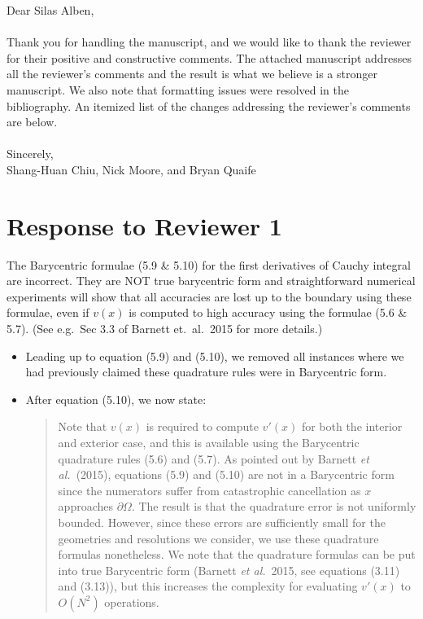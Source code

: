 \documentclass[11pt]{article}
\newcommand{\comment}[1]{{\color{blue} #1}}
\begin{document}
\noindent
Dear Silas Alben,
\\ \\
\noindent
Thank you for handling the manuscript, and we would like to thank the
reviewer for their positive and constructive comments.  The attached
manuscript addresses all the reviewer's comments and the result is what
we believe is a stronger manuscript.  We also note that formatting
issues were resolved in the bibliography. An itemized list of the
changes addressing the reviewer's comments are below.
\\ \\
\noindent
Sincerely,
\\
\noindent
Shang-Huan Chiu, Nick Moore, and Bryan Quaife

\section*{Response to Reviewer 1}

\noindent
\comment{The Barycentric formulae (5.9 \& 5.10) for the first
derivatives of Cauchy integral are incorrect. They are NOT true
barycentric form and straightforward numerical experiments will show
that all accuracies are lost up to the boundary using these formulae,
even if $v(x)$ is computed to high accuracy using the formulae (5.6 \&
5.7). (See e.g.~Sec 3.3 of Barnett et.~al.~2015 for more details.)}
\begin{itemize}
  \item Leading up to equation (5.9) and (5.10), we removed all
    instances where we had previously claimed these quadrature rules
    were in Barycentric form.

  \item After equation (5.10), we now state:
    \begin{quotation}
      \noindent
      Note that $v(x)$ is required to compute $v'(x)$ for both the
      interior and exterior case, and this is available using the
      Barycentric quadrature rules (5.6) and (5.7). As pointed out by
      Barnett {\em et al.}~(2015), equations (5.9) and (5.10) are not in
      a Barycentric form since the numerators suffer from catastrophic
      cancellation as $x$ approaches $\partial\Omega$. The result is
      that the quadrature error is not uniformly bounded. However, since
      these errors are sufficiently small for the geometries and
      resolutions we consider, we use these quadrature formulas
      nonetheless. We note that the quadrature formulas can be put into
      true Barycentric form (Barnett {\em et al.}~2015, see equations
      (3.11) and (3.13)), but this increases the complexity for
      evaluating $v'(x)$ to $O(N^2)$ operations. 
    \end{quotation}

\end{itemize}
\end{document}
